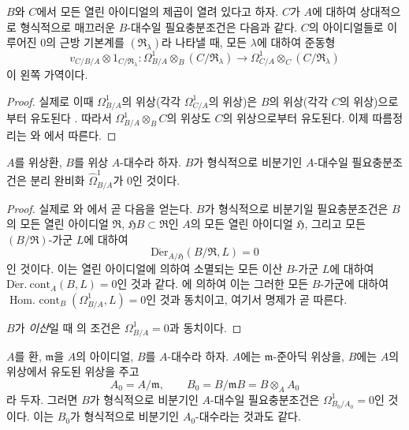 \begin{corollary}[20.7.3]
\label{0.20.7.3-ko}
$B$와 $C$에서 모든 열린 아이디얼의 제곱이 열려 있다고 하자. $C$가
$A$에 대하여 상대적으로 형식적으로 매끄러운 $B$-대수일 필요충분조건은
다음과 같다. $C$의 아이디얼들로 이루어진 $0$의 근방 기본계를
$(\mathfrak R_\lambda)$라 나타낼 때, 모든 $\lambda$에 대하여 준동형
\begin{equation}
\tag{20.7.3.1}
\label{0.20.7.3.1-ko}
  v_{C/B/A}\otimes 1_{C/\mathfrak R_\lambda}:
  \Omega^1_{B/A}\otimes_B(C/\mathfrak R_\lambda)\longrightarrow
  \Omega^1_{C/A}\otimes_C(C/\mathfrak R_\lambda)
\end{equation}
이 왼쪽 가역이다.
\end{corollary}

\begin{proof}
실제로 이때 $\Omega^1_{B/A}$의 위상(각각 $\Omega^1_{C/A}$의 위상)은
$B$의 위상(각각 $C$의 위상)으로부터 유도된다
. 따라서 $\Omega^1_{B/A}\otimes_B C$의 위상도
$C$의 위상으로부터 유도된다. 이제 따름정리는 와
에서 따른다.
\end{proof}

\begin{proposition}[20.7.4]
\label{0.20.7.4-ko}
$A$를 위상환, $B$를 위상 $A$-대수라 하자. $B$가 형식적으로
비분기인 $A$-대수일 필요충분조건은 분리 완비화
$\widehat{\Omega}^1_{B/A}$가 $0$인 것이다.
\end{proposition}

\begin{proof}
실제로 와 에서 곧 다음을
얻는다. $B$가 형식적으로 비분기일 필요충분조건은 $B$의 모든 열린
아이디얼 $\mathfrak R$, $\mathfrak HB\subset\mathfrak R$인 $A$의 모든
열린 아이디얼 $\mathfrak H$, 그리고 모든 $(B/\mathfrak R)$-가군 $L$에
대하여
\[
  \operatorname{D\acute{e}r}_{A/\mathfrak H}
  (B/\mathfrak R,L)=0
\]
인 것이다. 이는 열린 아이디얼에 의하여 소멸되는 모든 이산
$B$-가군 $L$에 대하여
$\operatorname{D\acute{e}r.\ cont}_A(B,L)=0$인 것과 같다.
에 의하여 이는 그러한 모든 $B$-가군에 대하여
$\operatorname{Hom.\ cont}_B(\Omega^1_{B/A},L)=0$인 것과 동치이고,
여기서 명제가 곧 따른다.

$B$가 \emph{이산}일 때 의 조건은
$\Omega^1_{B/A}=0$과 동치이다.
\end{proof}

\begin{corollary}[20.7.5]
\label{0.20.7.5-ko}
$A$를 환, $\mathfrak m$을 $A$의 아이디얼, $B$를 $A$-대수라 하자.
$A$에는 $\mathfrak m$-준아딕 위상을, $B$에는 $A$의 위상에서 유도된
위상을 주고
\[
  A_0=A/\mathfrak m,\qquad
  B_0=B/\mathfrak mB=B\otimes_A A_0
\]
라 두자. 그러면 $B$가 형식적으로 비분기인 $A$-대수일 필요충분조건은
$\Omega^1_{B_0/A_0}=0$인 것이다. 이는 $B_0$가 형식적으로 비분기인
$A_0$-대수라는 것과도 같다.
\end{corollary}

